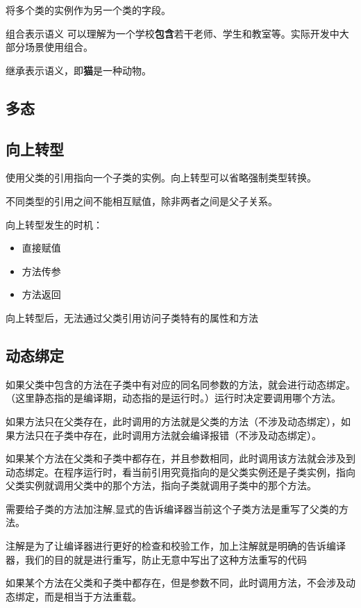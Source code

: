 \documentclass[a4paper]{report}
\begin{document}
将多个类的实例作为另一个类的字段。

组合表示语义
可以理解为一个学校\textbf{包含}若干老师、学生和教室等。实际开发中大部分场景使用组合。

继承表示语义，即\textbf{猫}是一种动物。
\subsection{多态}
\subsection{向上转型}
使用父类的引用指向一个子类的实例。向上转型可以省略强制类型转换。

不同类型的引用之间不能相互赋值，除非两者之间是父子关系。

向上转型发生的时机：
\begin{itemize}
\itemsep=0pt \parskip =0pt
\item 直接赋值
\item 方法传参
\item 方法返回
\end{itemize}
向上转型后，无法通过父类引用访问子类特有的属性和方法

\subsection{动态绑定}
如果父类中包含的方法在子类中有对应的同名同参数的方法，就会进行动态绑定。（这里静态指的是编译期，动态指的是运行时。）运行时决定要调用哪个方法。

如果方法只在父类存在，此时调用的方法就是父类的方法（不涉及动态绑定），如果方法只在子类中存在，此时调用方法就会编译报错（不涉及动态绑定）。

如果某个方法在父类和子类中都存在，并且参数相同，此时调用该方法就会涉及到动态绑定。在程序运行时，看当前引用究竟指向的是父类实例还是子类实例，指向父类实例就调用父类中的那个方法，指向子类就调用子类中的那个方法。

\begin{tips}
需要给子类的方法加注解,显式的告诉编译器当前这个子类方法是重写了父类的方法。

注解是为了让编译器进行更好的检查和校验工作，加上注解就是明确的告诉编译器，我们的目的就是进行重写，防止无意中写出了这种方法重写的代码
\end{tips}

如果某个方法在父类和子类中都存在，但是参数不同，此时调用方法，不会涉及动态绑定，而是相当于方法重载。
\end{document}

